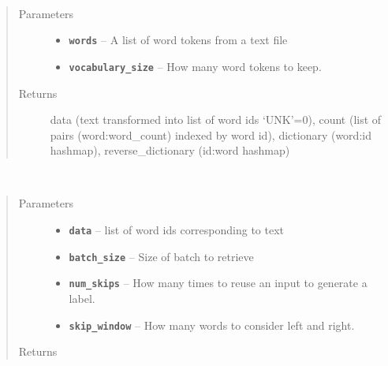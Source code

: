 \documentclass[letterpaper,10pt,english]{sphinxmanual}
\begin{document}

\begin{fulllineitems}
\label{models:skipgram.build_dataset}~\begin{quote}\begin{description}
\item[{Parameters}] \leavevmode\begin{itemize}
\item {} 
\textbf{\texttt{words}} -- A list of word tokens from a text file

\item {} 
\textbf{\texttt{vocabulary\_size}} -- How many word tokens to keep.

\end{itemize}

\item[{Returns}] \leavevmode
data (text transformed into list of word ids `UNK'=0), count (list of pairs (word:word\_count) indexed by word id), dictionary (word:id hashmap), reverse\_dictionary (id:word hashmap)

\end{description}\end{quote}

\end{fulllineitems}


\begin{fulllineitems}
\label{models:skipgram.generate_batch}~\begin{quote}\begin{description}
\item[{Parameters}] \leavevmode\begin{itemize}
\item {} 
\textbf{\texttt{data}} -- list of word ids corresponding to text

\item {} 
\textbf{\texttt{batch\_size}} -- Size of batch to retrieve

\item {} 
\textbf{\texttt{num\_skips}} -- How many times to reuse an input to generate a label.

\item {} 
\textbf{\texttt{skip\_window}} -- How many words to consider left and right.

\end{itemize}

\item[{Returns}] \leavevmode


\end{description}\end{quote}

\end{fulllineitems}
\end{document}
